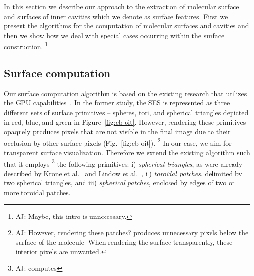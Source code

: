 In this section we describe our approach to the extraction of molecular surface and surfaces of inner cavities which we denote as surface features.
First we present the algorithms for the computation of molecular surfaces and cavities and then we show how we deal with special cases occurring within the surface construction.
\footnote{AJ: Maybe, this intro is unnecessary.}

\subsection{Surface computation}
\label{sec:ecb}
Our surface computation algorithm is based on the existing research that utilizes the GPU capabilities~\cite{krone2011parallel}.
In the former study, the SES is represented as three different sets of surface primitives -- spheres, tori, and spherical triangles depicted in red, blue, and green in Figure~\ref{fig:cb-oit}.
However, rendering these primitives opaquely produces pixels that are not visible in the final image due to their occlusion by other surface pixels (Fig.~\ref{fig:cb-oit}).
\footnote{AJ: However, rendering these patches? produces unnecessary pixels below the surface of the molecule. When rendering the surface transparently, these interior pixels are unwanted.}
In our case, we aim for transparent surface visualization.
Therefore we extend the existing algorithm such that it employs
\footnote{AJ: computes}
the following primitives:
i) \textit{spherical triangles}, as were already described by Krone et al.~\cite{krone2011parallel} and Lindow et al.~\cite{lindow2010accelerated}, ii)
\textit{toroidal patches}, delimited by two spherical triangles, and iii) \textit{spherical patches}, enclosed by edges of two or more toroidal patches.

